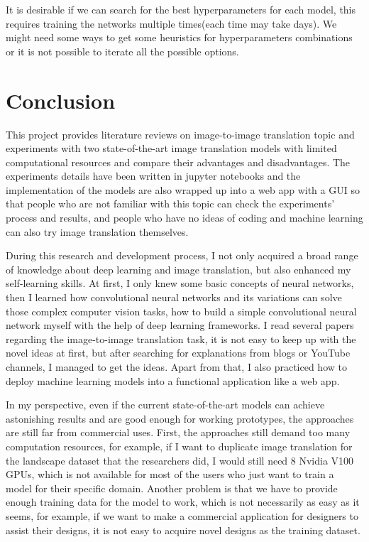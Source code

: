 \begin{itemize}
    It is desirable if we can search for the best hyperparameters for each model, this requires 
    training the networks multiple times(each time may take days). We might need some ways to 
    get some heuristics for hyperparameters combinations or it is not possible to iterate all 
    the possible options.
\end{itemize}

\section{Conclusion}
This project provides literature reviews on image-to-image translation topic
and experiments with two state-of-the-art image translation 
models with limited computational resources and compare their advantages and 
disadvantages. The experiments details have been written in jupyter notebooks 
and the implementation of the models are also wrapped up into a web app 
with a GUI so that people who are not familiar 
with this topic can check the experiments' process and results, and people
who have no ideas of coding and machine learning can also try image translation themselves.  

During this research and development process, I not only acquired a broad range of knowledge 
about deep learning and image translation, but also enhanced my self-learning skills. 
At first, I only knew some basic concepts of neural networks, then I learned how convolutional 
neural networks and its variations can solve those complex computer vision tasks, how to build a 
simple convolutional neural network myself with the help of deep learning frameworks. I read 
several papers regarding the image-to-image translation task, it is not easy to keep up with the 
novel ideas at first, but after searching for explanations from blogs or YouTube channels, I 
managed to get the ideas. Apart from that, I also practiced how to deploy machine learning 
models into a functional application like a web app.

In my perspective, even if the current state-of-the-art models can achieve 
astonishing results and are good enough for working prototypes, 
the approaches are still far from commercial uses.
First, the approaches still demand too many computation resources,
for example, if I want to duplicate image translation for the landscape dataset 
that the researchers did, I would still need 8 Nvidia V100 GPUs, which is not 
available for most of the users who just want to train a model for their specific domain. 
Another problem is that we have to provide enough training data for the model to work,
which is not necessarily as easy as it seems, for example, 
if we want to make a commercial application for designers to assist their designs, 
it is not easy to acquire novel designs as the training dataset.